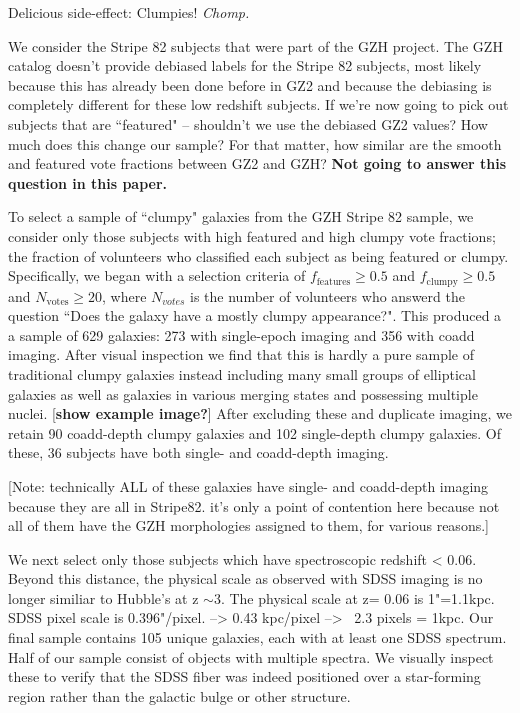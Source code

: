 \documentclass[twocolumn]{aastex6}
\newcommand{\ffeat}{f_{\mathrm{features}}}
\newcommand{\fclump}{f_{\mathrm{clumpy}}}
\begin{document}
Delicious side-effect: Clumpies! \textit{Chomp.}

We consider the Stripe 82 subjects that were part of the GZH project.  
The GZH catalog doesn't provide debiased labels for the Stripe 82 subjects, most likely because this has already been done before in GZ2 and because the debiasing is completely different for these low redshift subjects. If we're now going to pick out subjects that are ``featured" -- shouldn't we use the debiased GZ2 values? How much does this change our sample? For that matter, how similar are the smooth and featured vote fractions between GZ2 and GZH? 
\textbf{Not going to answer this question in this paper.}



To select a sample of ``clumpy" galaxies from the GZH Stripe 82 sample, we consider only those subjects with  high featured and high clumpy vote fractions; the fraction of volunteers who classified each subject as being featured or clumpy. Specifically, we began with a selection criteria of $\ffeat \ge 0.5$ and  $\fclump \ge 0.5$ and $N_{\mathrm{votes}} \ge 20$, where $N_{votes}$ is the number of volunteers who answerd the question ``Does the galaxy have a mostly clumpy appearance?".  This produced a a sample of 629 galaxies: 273 with single-epoch imaging and 356 with coadd imaging. After visual inspection we find that this is hardly a pure sample of traditional clumpy galaxies instead including many small groups of elliptical galaxies as well as galaxies in various merging states and possessing multiple nuclei. [\textbf{show example image?}] After excluding these and duplicate imaging, we retain 90 coadd-depth clumpy galaxies and 102 single-depth clumpy galaxies. Of these, 36 subjects have both single- and coadd-depth imaging.

 [Note: technically ALL of these galaxies have single- and coadd-depth imaging because they are all in Stripe82. it's only a point of contention here because not all of them have the GZH morphologies assigned to them, for various reasons.]


We next select only those subjects which have spectroscopic redshift < 0.06. Beyond this distance, the physical scale as observed with SDSS imaging is no longer similiar to Hubble's at z $\sim3$. The physical scale at z= 0.06 is 1"=1.1kpc. SDSS pixel scale is 0.396"/pixel. --> 0.43 kpc/pixel -->  ~2.3 pixels = 1kpc.   Our final sample contains 105 unique galaxies, each with at least one SDSS spectrum. Half of our sample consist of objects with multiple spectra. We visually inspect these to verify that the SDSS fiber was indeed positioned over a star-forming region rather than the galactic bulge or other structure. 
\end{document}
